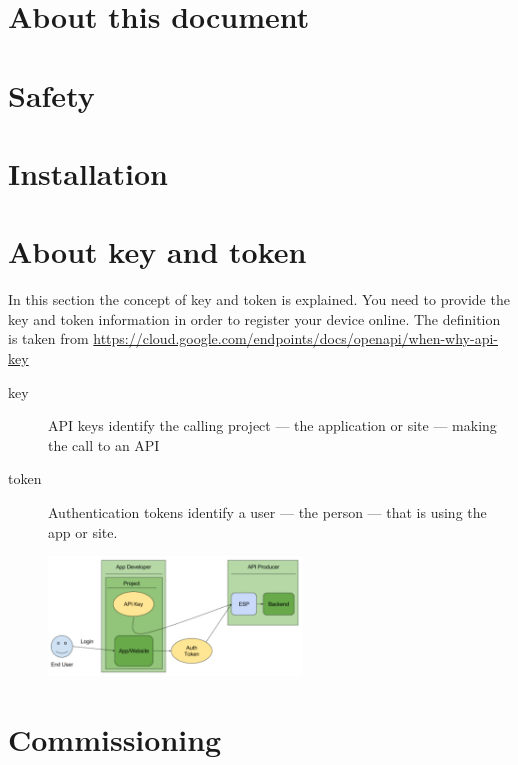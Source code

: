 \documentclass[]{article}
\begin{document}
\newpage
\section{About this document}
\hypertarget{about_this_document}{}%
\blindtext[10]

\newpage
\section{Safety}
\hypertarget{safety}{}%
\blindtext[10]

\newpage
\section{Installation}
\hypertarget{installation}{}
\blindtext[10]

\newpage
\hypertarget{key_and_token}{}
\section{About key and token}

In this section the concept of key and token is explained. You need to provide the key and token information in order to register your device online. The definition is taken from \url{https://cloud.google.com/endpoints/docs/openapi/when-why-api-key}
\begin{description}
	\item[key] API keys identify the calling project — the application or site — making the call to an API
	\item[token] Authentication tokens identify a user — the person — that is using the app or site.
\end{description}
\begin{figure}[h]
\begin{center}
\includegraphics[width=0.6\textwidth]{api_keys_overview.png}
\end{center}
\end{figure}
\newpage
\section{Commissioning}
%
\hypertarget{commissioning}{}	
\blindtext[10]

\newpage

	
\end{document}
